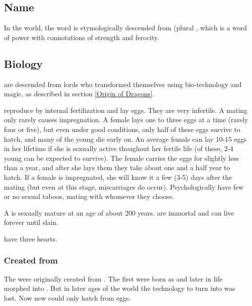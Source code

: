 \subsection{Name}
In the \Miith{} world, the word \quo{\dragon} is etymologically descended from \emph{\Draecchonosh{}} (plural \emph{\Draecchonosh{}}, which is a \draconic{} word of power with connotations of strength and ferocity. 









\subsection{Biology}
\Dragons{} are descended from \naga{} lords who transformed themselves using bio-technology and magic, as described in section \ref{Origin of Dragons}. 

\Dragons{} reproduce by internal fertilization and lay eggs. They are very infertile. A mating only rarely causes impregnation. A female lays one to three eggs at a time (rarely four or five), but even under good conditions, only half of these eggs survive to hatch, and many of the young die early on. An average female can lay 10-15 eggs in her lifetime if she is sexually active thoughout her fertile life (of these, 2-4 young can be expected to survive). The female carries the eggs for slightly less than a year, and after she lays them they take about one and a half year to hatch. If a female is impregnated, she will know it a few (3-5) days after the mating (but even at this stage, miscarriages do occur).  
Psychologically \dragons{} have few or no sexual taboos, mating with whomever they choose. 

A \dragon{} is sexually mature at an age of about 200 years. 
\Dragons{} are immortal and can live forever until slain. 

\Dragons{} have three hearts. 





\subsubsection{Created from \ophidians}
The \dragons were originally created from \ophidians.
The first \dragons were born as \ophidians and later in life morphed into \dragons.
But in later ages of the world the technology to turn \ophidians into \dragons was lost.
Now new \dragons could only hatch from \dragon eggs.

